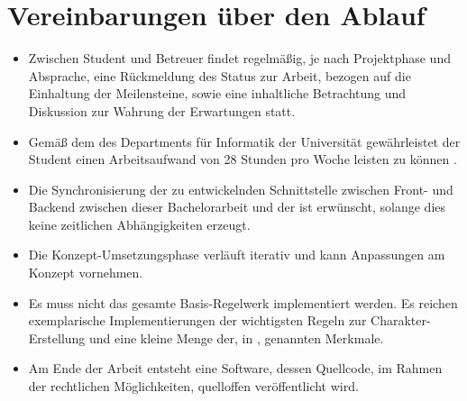 \section{Vereinbarungen über den Ablauf}
\label{sec:vereinbarungen-uber-den-ablauf}

\begin{itemize}
    \item Zwischen Student und Betreuer findet regelmäßig, je nach Projektphase und Absprache, eine Rückmeldung des Status zur Arbeit, bezogen auf die Einhaltung der Meilensteine, sowie eine inhaltliche Betrachtung und Diskussion zur Wahrung der Erwartungen statt.
    \item Gemäß dem  des Departments für Informatik der Universität gewährleistet der Student einen Arbeitsaufwand von 28 Stunden pro Woche leisten zu können .
    \item Die Synchronisierung der zu entwickelnden Schnittstelle zwischen Front- und Backend zwischen dieser Bachelorarbeit und der  ist erwünscht, solange dies keine zeitlichen Abhängigkeiten erzeugt.
    \item Die Konzept-Umsetzungsphase verläuft iterativ und kann \ggfs Anpassungen am Konzept vornehmen.
    \item Es muss nicht das gesamte Basis-Regelwerk implementiert werden.
    Es reichen exemplarische Implementierungen der wichtigsten Regeln zur Charakter-Erstellung und eine kleine Menge der, in , genannten Merkmale.
    \item Am Ende der Arbeit entsteht eine Software, dessen Quellcode, im Rahmen der rechtlichen Möglichkeiten, quelloffen veröffentlicht wird.
\end{itemize}